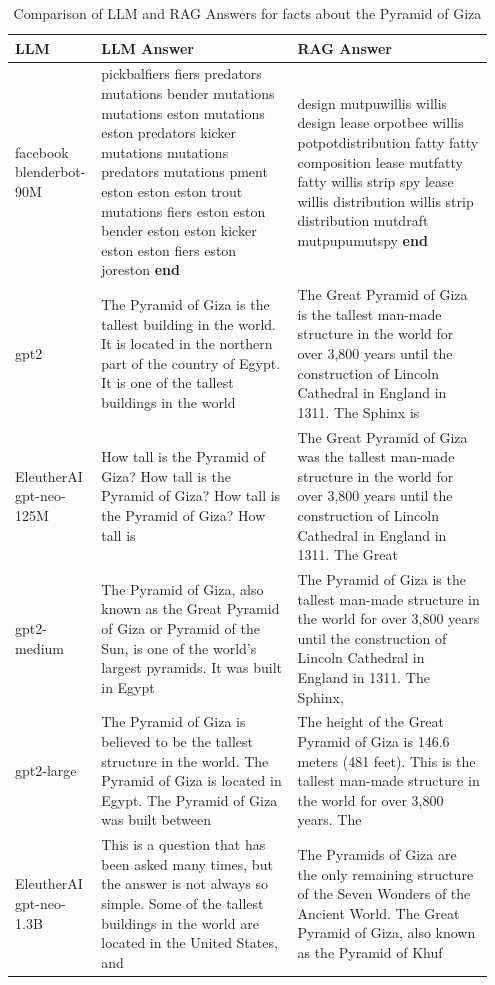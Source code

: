 \documentclass{wseas}
\begin{document}
\begin{table}[htbp]
\centering
\begin{tabular}{|p{0.15\linewidth}|p{0.4\linewidth}|p{0.4\linewidth}|}
\hline
\textbf{LLM} & \textbf{LLM Answer} & \textbf{RAG Answer} \\ \hline
facebook blenderbot-90M & pickbalfiers fiers predators mutations bender mutations mutations eston mutations eston predators kicker mutations mutations predators mutations pment eston eston eston trout mutations fiers eston eston bender eston eston kicker eston eston fiers eston joreston \textbf{end} & design mutpuwillis willis design lease orpotbee willis potpotdistribution fatty fatty composition lease mutfatty fatty willis strip spy lease willis distribution willis strip distribution mutdraft mutpupumutspy \textbf{end} \\ \hline
gpt2 & The Pyramid of Giza is the tallest building in the world. It is located in the northern part of the country of Egypt. It is one of the tallest buildings in the world & The Great Pyramid of Giza is the tallest man-made structure in the world for over 3,800 years until the construction of Lincoln Cathedral in England in 1311. The Sphinx is \\ \hline
EleutherAI gpt-neo-125M & How tall is the Pyramid of Giza? How tall is the Pyramid of Giza? How tall is the Pyramid of Giza? How tall is & The Great Pyramid of Giza was the tallest man-made structure in the world for over 3,800 years until the construction of Lincoln Cathedral in England in 1311. The Great \\ \hline
gpt2-medium & The Pyramid of Giza, also known as the Great Pyramid of Giza or Pyramid of the Sun, is one of the world's largest pyramids. It was built in Egypt & The Pyramid of Giza is the tallest man-made structure in the world for over 3,800 years until the construction of Lincoln Cathedral in England in 1311. The Sphinx, \\ \hline
gpt2-large & The Pyramid of Giza is believed to be the tallest structure in the world. The Pyramid of Giza is located in Egypt. The Pyramid of Giza was built between & The height of the Great Pyramid of Giza is 146.6 meters (481 feet). This is the tallest man-made structure in the world for over 3,800 years. The \\ \hline
EleutherAI gpt-neo-1.3B & This is a question that has been asked many times, but the answer is not always so simple. Some of the tallest buildings in the world are located in the United States, and & The Pyramids of Giza are the only remaining structure of the Seven Wonders of the Ancient World. The Great Pyramid of Giza, also known as the Pyramid of Khuf \\ \hline
\end{tabular}
\caption{Comparison of LLM and RAG Answers for facts about the Pyramid of Giza}
\end{table}
\end{document}
